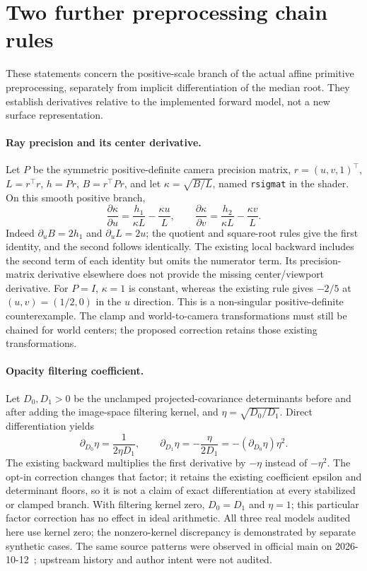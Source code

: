 \documentclass[11pt,a4paper]{article}
\begin{document}
\section{Two further preprocessing chain rules}
These statements concern the positive-scale branch of the actual
affine primitive preprocessing, separately from implicit differentiation
of the median root. They establish derivatives relative to the implemented
forward model, not a new surface representation.

\paragraph{Ray precision and its center derivative.}
Let $P$ be the symmetric positive-definite camera precision matrix,
$r=(u,v,1)^\top$, $L=r^\top r$, $h=Pr$, $B=r^\top Pr$, and let
$\kappa=\sqrt{B/L}$, named \texttt{rsigmat} in the shader.
On this smooth positive branch,
\[
 \frac{\partial\kappa}{\partial u}
 =\frac{h_1}{\kappa L}-\frac{\kappa u}{L},\qquad
 \frac{\partial\kappa}{\partial v}
 =\frac{h_2}{\kappa L}-\frac{\kappa v}{L}.
\]
Indeed $\partial_u B=2h_1$ and $\partial_u L=2u$;
the quotient and square-root rules give the first identity, and the
second follows identically. The existing local backward includes
the second term of each identity but omits the numerator term. Its
precision-matrix derivative elsewhere does not provide the missing
center/viewport derivative. For $P=I$, $\kappa=1$ is constant, whereas
the existing rule gives $-2/5$ at $(u,v)=(1/2,0)$ in the $u$ direction.
This is a non-singular positive-definite counterexample. The clamp
and world-to-camera transformations must still be chained for world
centers; the proposed correction retains those existing transformations.

\paragraph{Opacity filtering coefficient.}
Let $D_0,D_1>0$ be the unclamped projected-covariance determinants
before and after adding the image-space filtering kernel, and
$\eta=\sqrt{D_0/D_1}$. Direct differentiation yields
\[
 \partial_{D_0}\eta=\frac{1}{2\eta D_1},\qquad
 \partial_{D_1}\eta=-\frac{\eta}{2D_1}
 =-(\partial_{D_0}\eta)\eta^2.
\]
The existing backward multiplies the first derivative by $-\eta$
instead of $-\eta^2$. The opt-in correction changes that factor;
it retains the existing coefficient epsilon and determinant floors,
so it is not a claim of exact differentiation at every stabilized
or clamped branch. With filtering kernel zero, $D_0=D_1$ and
$\eta=1$; this particular factor correction has no effect in ideal
arithmetic. All three real models audited here use kernel zero;
the nonzero-kernel discrepancy is demonstrated by separate synthetic
cases. The same source patterns were observed in official main on
2026-10-12~\cite{gggscode}; upstream history and author intent were not audited.
\end{document}
